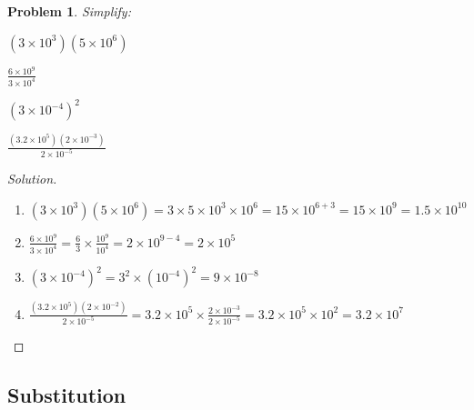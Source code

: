 \documentclass[oneside]{book}
\theoremstyle{mystyle}
\newtheorem{problem}{Problem}[section]
\begin{document}
\begin{problem}
Simplify:
\begin{enumerate}
    \begin{multicols}{4}
    \item $(3\times 10^3)(5\times 10^6)$
    \item $\frac{6\times 10^9}{3\times 10^4}$
    \item $(3\times 10^{-4})^{2}$
    \item $\frac{(3.2\times 10^{5})(2\times 10^{-3})}{2\times 10^{-5}}$
    \end{multicols}
\end{enumerate}
\end{problem}
\begin{proof}[Solution]
\
\begin{enumerate}
    \item $(3\times 10^3)(5\times 10^6) = 3\times 5 \times 10^3 \times 10^6 = 15 \times 10^{6+3} = 15\times 10^9 = \boxed{1.5\times 10^{10}}$
    \item $\frac{6\times 10^9}{3\times 10^4} =  \frac{6}{3}\times \frac{10^9}{10^4} = 2\times 10^{9-4} = \boxed{2\times 10^5}$
    \item $(3\times 10^{-4})^2 = 3^2 \times (10^{-4})^2 = \boxed{9\times 10^{-8}}$
    \item $\frac{(3.2\times 10^{5})(2\times 10^{-2})}{2\times 10^{-5}} = 3.2\times 10^{5} \times \frac{2\times 10^{-3}}{2\times 10^{-5}} = 3.2 \times 10^{5}\times 10^{2} = \boxed{3.2\times 10^{7}}$
\end{enumerate}
\end{proof}
\subsection{Substitution}
\end{document}
